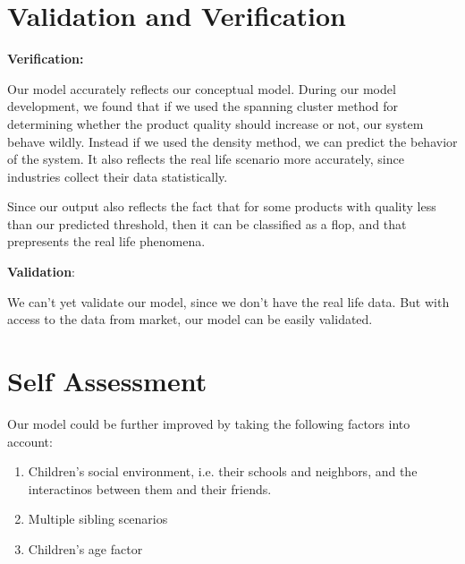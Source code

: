 \documentclass[article, 11pt, a4paper, onesize]{memoir}
\begin{document}
\section{Validation and Verification}

\textbf{Verification:}

Our model accurately reflects our conceptual model. During our model development, we found
that if we used the spanning cluster method for determining whether the product quality
should increase or not, our system behave wildly. Instead if we used the density method,
we can predict the behavior of the system. It also reflects the real life scenario more
accurately, since industries collect their data statistically. 

Since our output also reflects the fact that for some products with quality less than our
predicted threshold, then it can be classified as a flop, and that prepresents the real
life phenomena.

\textbf{Validation}:

We can't yet validate our model, since we don't have the real life data. But with access
to the data from market, our model can be easily validated.




\section{Self Assessment}

Our model could be further improved by taking the following factors into account:

\begin{enumerate}
    \item Children's social environment, i.e. their schools and neighbors, and the
        interactinos between them and their friends.
    \item Multiple sibling scenarios
    \item Children's age factor
\end{enumerate}
\end{document}

